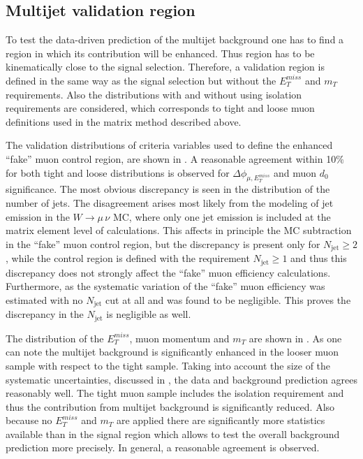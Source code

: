 \subsection{Multijet validation region}


To test the data-driven prediction of the multijet background one 
has to find a region
in which its contribution will be enhanced. 
Thus region has to be kinematically 
close to the signal selection.
Therefore, a validation region is defined in the same way as the signal selection but without the $E_T^{miss}$ and $m_T$ requirements. 
Also the distributions with and without using isolation requirements are considered, 
which corresponds to tight and loose muon definitions used in the matrix method described above.

The validation distributions of criteria variables used to define the enhanced ``fake'' muon control region, are shown in .
A reasonable agreement within 10$\%$ for both tight and loose distributions is observed for $\Delta\phi_{\mu,E_T^{miss}}$ and muon $d_0$ significance.
The most obvious discrepancy is seen in the
distribution of the number of jets. The disagreement arises most likely from the modeling of jet emission in the $W\to\mu\,\nu$ MC, where only one jet emission is included at the
matrix element level of calculations.
This affects in principle the MC subtraction in the ``fake'' muon control region,
but the discrepancy is present only for $N_\mathrm{jet}\geq2$, while the control region is 
defined with the requirement $N_\mathrm{jet}\geq1$ and thus this discrepancy does not strongly affect the ``fake'' muon efficiency calculations.
Furthermore, as the systematic variation of the ``fake'' muon efficiency was estimated with no $N_\mathrm{jet}$ cut at all and was found to be negligible. This proves the discrepancy in the $N_\mathrm{jet}$ is negligible as well.

The distribution of the $E_T^{miss}$, muon momentum and $m_T$ are shown in .
As one can note the multijet background is significantly enhanced in the looser muon sample with respect to the tight sample. 
Taking into account the size of the systematic uncertainties, discussed in , the data and background prediction agrees reasonably well. 
The tight muon sample includes the isolation requirement and thus the contribution from multijet background is significantly reduced. Also because no $E_T^{miss}$ and $m_T$ are applied 
there are significantly more statistics available than in the signal region which allows to test the overall background prediction more precisely. In general, a reasonable agreement is observed. 

